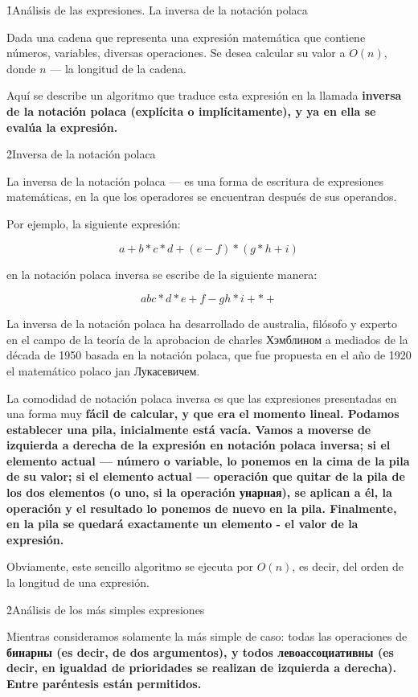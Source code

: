\h1{Análisis de las expresiones. La inversa de la notación polaca}

Dada una cadena que representa una expresión matemática que contiene números, variables, diversas operaciones. Se desea calcular su valor a $O (n)$, donde $n$ --- la longitud de la cadena.

Aquí se describe un algoritmo que traduce esta expresión en la llamada \bf{inversa de la notación polaca} (explícita o implícitamente), y ya en ella se evalúa la expresión.


\h2{Inversa de la notación polaca}

La inversa de la notación polaca --- es una forma de escritura de expresiones matemáticas, en la que los operadores se encuentran después de sus operandos.

Por ejemplo, la siguiente expresión:

$$ a + b * c * d + (e - f) * (g * h + i) $$

en la notación polaca inversa se escribe de la siguiente manera:

$$ a b c * d * e + f - g h * i + * + $$

La inversa de la notación polaca ha desarrollado de australia, filósofo y experto en el campo de la teoría de la aprobacion de charles Хэмблином a mediados de la década de 1950 basada en la notación polaca, que fue propuesta en el año de 1920 el matemático polaco jan Лукасевичем.

La comodidad de notación polaca inversa es que las expresiones presentadas en una forma muy \bf{fácil de calcular}, y que era el momento lineal. Podamos establecer una pila, inicialmente está vacía. Vamos a moverse de izquierda a derecha de la expresión en notación polaca inversa; si el elemento actual --- número o variable, lo ponemos en la cima de la pila de su valor; si el elemento actual --- operación que quitar de la pila de los dos elementos (o uno, si la operación унарная), se aplican a él, la operación y el resultado lo ponemos de nuevo en la pila. Finalmente, en la pila se quedará exactamente un elemento - el valor de la expresión.

Obviamente, este sencillo algoritmo se ejecuta por $O (n)$, es decir, del orden de la longitud de una expresión.


\h2{Análisis de los más simples expresiones}

Mientras consideramos solamente la más simple de caso: todas las operaciones de \bf{бинарны} (es decir, de dos argumentos), y todos \bf{левоассоциативны} (es decir, en igualdad de prioridades se realizan de izquierda a derecha). Entre paréntesis están permitidos.

